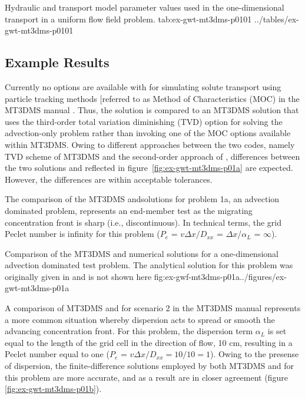 \begin{StandardTable}
	{Hydraulic and transport model parameter values used in the one-dimensional transport in a uniform flow field problem.}
	{tab:ex-gwt-mt3dms-p0101}
	{../tables/ex-gwt-mt3dms-p0101}
\end{StandardTable}

\subsection{Example Results}

Currently no options are available with \mf for simulating solute transport using particle tracking methods [referred to as Method of Characteristics (MOC) in the MT3DMS manual \cite{zheng1999mt3dms}.  Thus, the \mf solution is compared to an MT3DMS solution that uses the third-order total variation diminishing (TVD) option for solving the advection-only problem rather than invoking one of the MOC options available within MT3DMS.  Owing to different approaches between the two codes, namely TVD scheme of  MT3DMS and the second-order approach of \mf, differences between the two solutions and reflected in figure~\ref{fig:ex-gwt-mt3dms-p01a} are expected.  However, the differences are within acceptable tolerances.

The comparison of the MT3DMS and\mf solutions for problem 1a, an advection dominated problem, represents an end-member test as the migrating concentration front is sharp (i.e., discontinuous). In technical terms, the grid Peclet number is infinity for this problem ($P_e$ = $v\Delta x/D_{xx}$ = $\Delta x$/$\alpha_L$ = $\infty$).

\begin{StandardFigure}
	{Comparison of the MT3DMS and \mf numerical solutions for a one-dimensional advection dominated test problem.  The analytical solution for this problem was originally given in \cite{vanGenuchtenAlves1982} and is not shown here}
	{fig:ex-gwf-mt3dms-p01a}{../figures/ex-gwt-mt3dms-p01a}
\end{StandardFigure}

A comparison of MT3DMS and \mf for scenario 2 in the MT3DMS manual represents a more common situation whereby dispersion acts to spread or smooth the advancing concentration front.  For this problem, the dispersion term $\alpha_L$ is set equal to the length of the grid cell in the direction of flow, 10 cm, resulting in a Peclet number equal to one ($P_e$ = $v\Delta x/D_{xx} = 10/10 = 1$).  Owing to the presense of dispersion, the finite-difference solutions employed by both MT3DMS and \mf for this problem are more accurate, and as a result are in closer agreement (figure \ref{fig:ex-gwt-mt3dms-p01b}).

